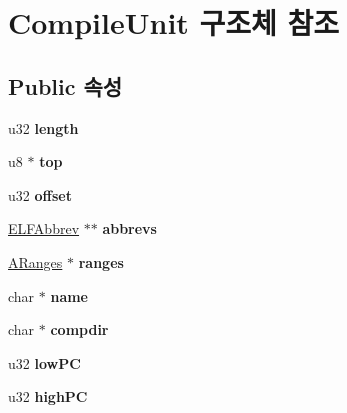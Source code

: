 \hypertarget{struct_compile_unit}{}\section{Compile\+Unit 구조체 참조}
\label{struct_compile_unit}
\subsection*{Public 속성}
\begin{DoxyCompactItemize}
\item 
\mbox{\label{struct_compile_unit_acad6384874d710baa10548c0bf9a391a}} 
u32 {\bfseries length}
\item 
\mbox{\label{struct_compile_unit_ace3ba5846b6ef2bce6fb6ecf08cad32f}} 
u8 $\ast$ {\bfseries top}
\item 
\mbox{\label{struct_compile_unit_a25babc3939d9beaf5f9fb713b06d7ff0}} 
u32 {\bfseries offset}
\item 
\mbox{\label{struct_compile_unit_a53e5f3d3a9863efd87c6bc56de6a8ede}} 
\mbox{\hyperlink{struct_e_l_f_abbrev}{E\+L\+F\+Abbrev}} $\ast$$\ast$ {\bfseries abbrevs}
\item 
\mbox{\label{struct_compile_unit_a35a7813d5c734076df26479b66448158}} 
\mbox{\hyperlink{struct_a_ranges}{A\+Ranges}} $\ast$ {\bfseries ranges}
\item 
\mbox{\label{struct_compile_unit_a56da363bb4b326b104c5d3e87a81ed6d}} 
char $\ast$ {\bfseries name}
\item 
\mbox{\label{struct_compile_unit_a9841cfa5f9c0facd787471fcbc433c79}} 
char $\ast$ {\bfseries compdir}
\item 
\mbox{\label{struct_compile_unit_acd16e32e4b2af3a0ebca497e6bfb79aa}} 
u32 {\bfseries low\+PC}
\item 
\mbox{\label{struct_compile_unit_a2adc2fbfd2e9f68c720b6bcff3f7d4bb}} 
u32 {\bfseries high\+PC}
\item 
\mbox{\label{struct_compile_unit_a378d867eb23538702956763f72e000f3}} 
$$
\end{DoxyCompactItemize}
